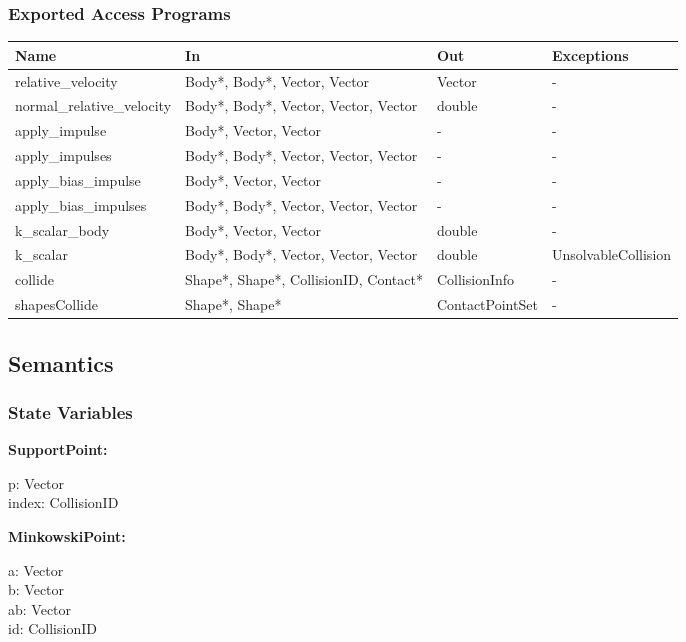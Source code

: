 \documentclass[12pt]{article}
\begin{document}
\subsubsection{Exported Access Programs} \label{SecEAPCollision}
	\renewcommand*{\arraystretch}{1.2}
	\begin{longtable}{| y | x{3.5cm} | y | x{3.5cm} |}
	\hline \textbf{Name} & \textbf{In} & \textbf{Out} & \textbf{Exceptions} \\ \hline 
	relative_velocity & Body*, Body*, Vector, Vector & Vector & - \\ \hline
	normal_relative_velocity & Body*, Body*, Vector, Vector, Vector & double & - \\ \hline
	apply_impulse & Body*, Vector, Vector & - & - \\ \hline
	apply_impulses & Body*, Body*, Vector, Vector, Vector & - & - \\ \hline
	apply_bias_impulse & Body*, Vector, Vector & - & - \\ \hline
	apply_bias_impulses & Body*, Body*, Vector, Vector, Vector & - & - \\ \hline
	k_scalar_body & Body*, Vector, Vector & double & - \\ \hline
	k_scalar & Body*, Body*, Vector, Vector, Vector & double & UnsolvableCollision \\ \hline
	collide & Shape*, Shape*, CollisionID, Contact* & CollisionInfo & - \\ \hline
	shapesCollide & Shape*, Shape* & ContactPointSet & - \\ \hline
\end{longtable}

\subsection{Semantics}

\subsubsection{State Variables} \label{SecSVCollision}
\textbf{SupportPoint:} 
\begin{multicols}{2}
	\noindent p: Vector \\
	index: CollisionID
\end{multicols}
	
\noindent \textbf{MinkowskiPoint:} 
\begin{multicols}{2}
	\noindent a: Vector \\
	b: Vector \\
	ab: Vector \\
	id: CollisionID
\end{multicols}
\end{document}

